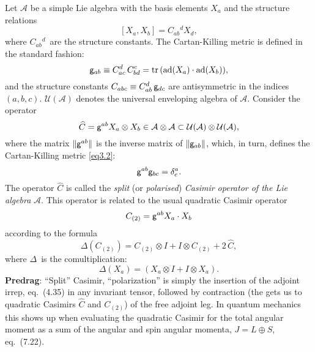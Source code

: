 \begin{description}
\bigskip

Let $\mathcal{A}$ be a simple Lie algebra with the basis elements $X_a$
and the structure relations
\begin{equation}
\label{eq3.1}
[X_a,X_b]= C{}_{ab}{}^dX_d,
\end{equation}
where $C{}_{ab}{}^d$~are the structure constants. The Cartan-Killing metric is defined in the standard fashion:
\begin{equation}
\label{eq3.2}
{\sf g}_{ab} \equiv C^{d}_{ac} \, C^{c}_{bd} =
\mathrm{tr}\,(\mathrm{ad}(X_a)\cdot \mathrm{ad}(X_b)),
\end{equation}
 and the structure constants $C_{abc} \equiv C^{d}_{ab} \, {\sf g}_{dc}$
 are antisymmetric in the indices $(a,b,c)$.
$\mathcal{U}(\mathcal{A})$ denotes the universal enveloping algebra of $\mathcal{A}$. Consider the operator
\begin{equation}
\label{eq3.3}
\widehat{C}  = {\sf g}^{ab} X_a \otimes
  X_b \in \mathcal{A}  \otimes  \mathcal{A}
   \subset \mathcal{U}(\mathcal{A}) \otimes\mathcal{U}(\mathcal{A}),
\end{equation}
 where the matrix $\|{\sf g}^{ab}\|$ is the inverse matrix of $\|{\sf g}_{ab}\|$, which, in turn, defines the Cartan-Killing metric \eqref{eq3.2}:
\begin{equation}
\label{eq3.4}
 {\sf g}^{ab}{\sf g}_{bc}=\delta^a_c.
 \end{equation}
 The operator $\widehat{C}$ is called the \textit{split} (or \textit{polarised}) \textit{Casimir operator of the Lie algebra} $\mathcal{A}$.
This operator is related to the usual quadratic Casimir operator
\begin{equation}
\label{eq3.5}
 C_{(2)} = {\sf g}^{ab}X_a \cdot X_b
\end{equation}
according to the formula
\begin{equation}
\label{eq3.6}
 \Delta(C_{(2)}) = C_{(2)} \otimes I + I \otimes C_{(2)} + 2 \, \widehat{C} ,
\end{equation}
where $\Delta$~is the comultiplication:
\begin{equation}
\label{eq3.7}
\Delta(X_a) = (X_a \otimes I + I \otimes X_a).
\end{equation}
{\bf Predrag}: ``Split'' Casimir, ``polarization'' is simply the
insertion of the adjoint irrep, 
{eq.~(4.35)} in any invariant tensor, followed by contraction (the gets
us to quadratic Casimirs $\widehat{C}$ and $C_{(2)}$) of the free adjoint
leg. In quantum mechanics this shows up when evaluating the quadratic
Casimir for the total angular moment as a sum of the angular and spin
angular momenta, $J=L\oplus{S}$, 
{eq.~(7.22)}.


\end{description}

